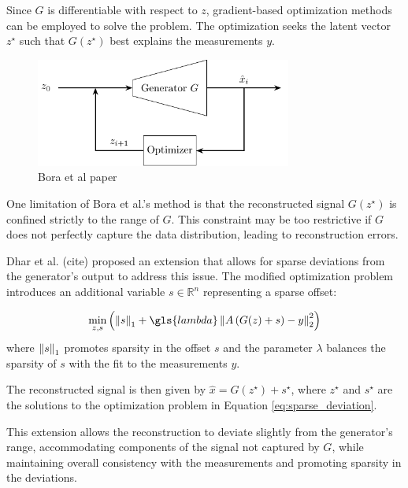 Since $G$ is differentiable with respect to $z$, gradient-based optimization methods can be employed to solve the problem.
The optimization seeks the latent vector $z^{\star}$ such that $G(z^{\star})$ best explains the measurements $y$.

\begin{figure}[h!]
    \centering
    \includegraphics[width=0.75\textwidth]{figures/02_related_work/latent_variable_optimization/build/latent_variable_optimization.pdf}
    \caption{Bora et al paper}
    \label{fig:gen_solver}
\end{figure}

One limitation of Bora et al.'s method is that the reconstructed signal $G(z^{\star})$ is confined strictly to the range of $G$.
This constraint may be too restrictive if $G$ does not perfectly capture the data distribution, leading to reconstruction errors.

Dhar et al. (cite) proposed an extension that allows for sparse deviations from the generator's output to address this issue.
The modified optimization problem introduces an additional variable $s \in \mathbb{R}^n$ representing a sparse offset:

\begin{equation}
 \min_{z, s}{\left(\norm{s}_1 + \gls{lambda} \norm{A \left( G(z) + s \right) - y}_2^2 \right)}
    \label{eq:sparse_deviation}
\end{equation}
where $\left\lVert s\right\rVert_1$ promotes sparsity in the offset $s$ and the parameter $\lambda$ balances the sparsity of $s$ with the fit to the measurements $y$.

The reconstructed signal is then given by $\hat{x} = G(z^\star) + s^\star$, where $z^\star$ and $s^\star$ are the solutions to the optimization problem in Equation \ref{eq:sparse_deviation}.

This extension allows the reconstruction to deviate slightly from the generator's range, accommodating components of the signal not captured by $G$, while maintaining overall consistency with the measurements and promoting sparsity in the deviations.

